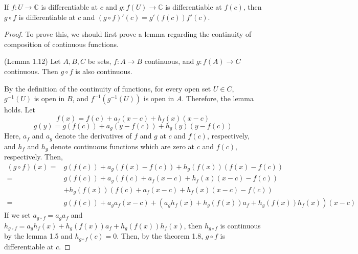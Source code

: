 \documentclass{article}
\begin{document}
\begin{multicols}{2}
\begin{exersise}
[Lemma 1.11]
If $f:U\to \mathbb{C}$ is differentiable at $c$ and $g:f(U)\to \mathbb{C}$ is differentiable at $f(c)$, then $g\circ f$ is differentiable at $c$ and $(g\circ f)'(c)=g'(f(c))f'(c)$.
\end{exersise}
\begin{proof}
To prove this, we should first prove a lemma regarding the continuity of composition of continuous functions.
\begin{notebox}
(Lemma 1.12) Let $A,B,C$ be sets, $f:A\to B$ continuous, and $g:f(A)\to C$ continuous. Then $g\circ f$ is also continuous.
\end{notebox}
By the definition of the continuity of functions, for every open set $U\in C$, $g^{-1}(U)$ is open in $B$, and $f^{-1}(g^{-1}(U))$ is open in $A$. Therefore, the lemma holds. Let
$$f(x) = f(c) + a_f(x-c) + h_f(x)(x-c)$$
$$g(y) = g(f(c)) + a_g(y-f(c)) + h_g(y)(y-f(c))$$
Here, $a_f$ and $a_g$ denote the derivatives of $f$ and $g$ at $c$ and $f(c)$, respectively, and $h_f$ and $h_g$ denote continuous functions which are zero at $c$ and $f(c)$, respectively.
Then,
\begin{align*}
    (g\circ f)(x) =& g(f(c)) + a_g(f(x)-f(c)) + h_g(f(x))(f(x)-f(c))\\
    =&g(f(c))+a_g(f(c)+a_f(x-c)+h_f(x)(x-c)-f(c))\\
    &+h_g(f(x))(f(c)+a_f(x-c)+h_f(x)(x-c)-f(c))\\
    =&g(f(c))+a_ga_f(x-c)+(a_gh_f(x)+h_g(f(x))a_f+h_g(f(x))h_f(x))(x-c)
\end{align*}
If we set $a_{g\circ f}=a_ga_f$ and $h_{g\circ f}=a_gh_f(x)+h_g(f(x))a_f+h_g(f(x))h_f(x)$, then $h_{g\circ f}$ is continuous by the lemma 1.5 and $h_{g\circ f}(c)=0$. Then, by the theorem 1.8, $g\circ f$ is differentiable at $c$.
\end{proof}

\clearpage



\end{multicols}
\end{document}
